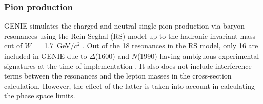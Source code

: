 

\subsubsection{Pion production}
\label{subsec:pionProduction}

GENIE simulates the charged and neutral single pion production via baryon resonances using the Rein-Seghal (RS) model \cite{REIN198179} up to the hadronic invariant mass cut of $W$~=~1.7~GeV/$c^2$ \cite{genie_ANDREOPOULOS201087, genie_andreopoulos2015}. Out of the 18 resonances in the RS model, only 16 are included in GENIE due to $\Delta$(1600) and $N$(1990) having ambiguous experimental signatures at the time of implementation \cite{genie_ANDREOPOULOS201087, genie_andreopoulos2015}. It also does not include interference terms between the resonances and the lepton masses in the cross-section calculation. However, the effect of the latter is taken into account in calculating the phase space limits. 


